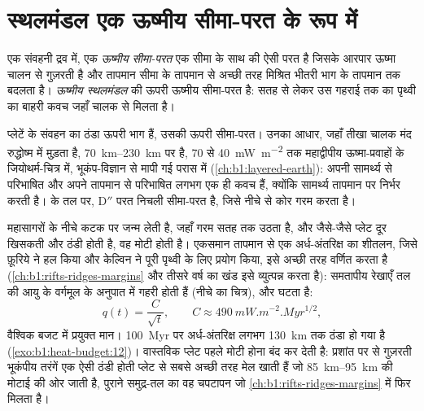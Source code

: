 \section{स्थलमंडल एक ऊष्मीय सीमा-परत के रूप में}\label{sec:b1:heat-budget:boundary-layer}

\begin{definition}\label{def:b1:heat-budget:boundary-layer}
एक संवहनी द्रव में, एक \emph{ऊष्मीय सीमा-परत} एक सीमा के साथ की ऐसी परत है जिसके आरपार ऊष्मा चालन से गुज़रती है और तापमान सीमा के तापमान से अच्छी तरह मिश्रित भीतरी भाग के तापमान तक बदलता है। \emph{ऊष्मीय स्थलमंडल}  की ऊपरी ऊष्मीय सीमा-परत है: सतह से लेकर उस गहराई तक का पृथ्वी का बाहरी कवच जहाँ चालक   से मिलता है।
\end{definition}

प्लेटें  के संवहन का ठंडा ऊपरी भाग हैं, उसकी ऊपरी सीमा-परत। उनका आधार, जहाँ तीखा चालक  मंद रुद्धोष्म में मुड़ता है, \qtyrange{70}{230}{km} पर है, 70 से \qty{40}{mW.m^{-2}} तक महाद्वीपीय ऊष्मा-प्रवाहों के जियोथर्म-चित्र में, भूकंप-विज्ञान से मापी गई परास में (\cref{ch:b1:layered-earth}): अपनी सामर्थ्य से परिभाषित  और अपने तापमान से परिभाषित  लगभग एक ही कवच हैं, क्योंकि सामर्थ्य तापमान पर निर्भर करती है।  के तल पर, D$''$ परत निचली सीमा-परत है, जिसे नीचे से कोर गरम करता है।

महासागरों के नीचे  कटक पर जन्म लेती है, जहाँ गरम  सतह तक उठता है, और जैसे-जैसे प्लेट दूर खिसकती और ठंडी होती है, वह मोटी होती है। एकसमान तापमान से एक अर्ध-अंतरिक्ष का शीतलन, जिसे फ़ूरिये ने हल किया और केल्विन ने पूरी पृथ्वी के लिए प्रयोग किया, इसे अच्छी तरह वर्णित करता है (\cref{ch:b1:rifts-ridges-margins} और तीसरे वर्ष का खंड इसे व्युत्पन्न करता है): समतापीय रेखाएँ तल की आयु के वर्गमूल के अनुपात में गहरी होती हैं (नीचे का चित्र), और  घटता है:
\[
  q(t) = \frac{C}{\sqrt t}, \qquad C \approx \qty{490}{mW.m^{-2}.Myr^{1/2}},
\]
वैश्विक बजट में प्रयुक्त मान। %
\qty{100}{Myr} पर अर्ध-अंतरिक्ष लगभग \qty{130}{km} तक ठंडा हो गया है (\cref{exo:b1:heat-budget:12})। वास्तविक प्लेट पहले मोटी होना बंद कर देती है: प्रशांत पर से गुज़रती भूकंपीय तरंगें एक ऐसी ठंडी होती प्लेट से सबसे अच्छी तरह मेल खाती हैं जो \qtyrange{85}{95}{km} की मोटाई की ओर जाती है, पुराने समुद्र-तल का वह चपटापन जो \cref{ch:b1:rifts-ridges-margins} में फिर मिलता है।

